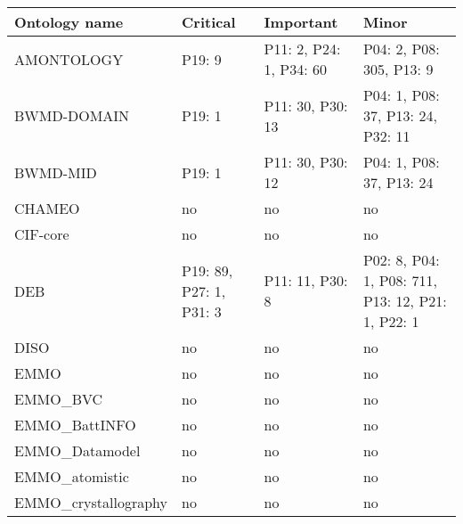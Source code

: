\begin{tabular}{m{5cm}m{3cm}m{3cm}m{3cm}}
\toprule
          Ontology name &                Critical &                               Important &                                             Minor \\
\midrule
             AMONTOLOGY &                  P19: 9 &                 P11: 2, P24: 1, P34: 60 &                          P04: 2, P08: 305, P13: 9 \\
            BWMD-DOMAIN &                  P19: 1 &                        P11: 30, P30: 13 &                 P04: 1, P08: 37, P13: 24, P32: 11 \\
               BWMD-MID &                  P19: 1 &                        P11: 30, P30: 12 &                          P04: 1, P08: 37, P13: 24 \\
                 CHAMEO &                      no &                                      no &                                                no \\
               CIF-core &                      no &                                      no &                                                no \\
                    DEB & P19: 89, P27: 1, P31: 3 &                         P11: 11, P30: 8 & P02: 8, P04: 1, P08: 711, P13: 12, P21: 1, P22: 1 \\
                   DISO &                      no &                                      no &                                                no \\
                   EMMO &                      no &                                      no &                                                no \\
               EMMO_BVC &                      no &                                      no &                                                no \\
          EMMO_BattINFO &                      no &                                      no &                                                no \\
         EMMO_Datamodel &                      no &                                      no &                                                no \\
         EMMO_atomistic &                      no &                                      no &                                                no \\
   EMMO_crystallography &                      no &                                      no &                                                no \\

\end{tabular}
